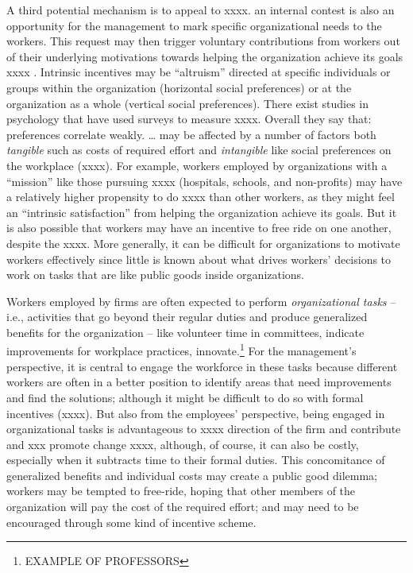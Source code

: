 \documentclass[12pt, titlepage]{article}
\begin{document}
A third potential mechanism is to appeal to xxxx. an internal contest is
also an opportunity for the management to mark specific organizational
needs to the workers. This request may then trigger voluntary
contributions from workers out of their underlying motivations towards
helping the organization achieve its goals xxxx
\citep{besley2005competition, rotemberg2006altruism}. Intrinsic
incentives may be ``altruism'' directed at specific individuals or
groups within the organization (horizontal social preferences) or at the
organization as a whole (vertical social preferences). There exist
studies in psychology that have used surveys to measure xxxx. Overall
they say that: preferences correlate weakly. \ldots{} may be affected by
a number of factors both \emph{tangible} such as costs of required
effort and \emph{intangible} like social preferences on the workplace
(xxxx). For example, workers employed by organizations with a
``mission'' like those pursuing xxxx (hospitals, schools, and
non-profits) may have a relatively higher propensity to do xxxx than
other workers, as they might feel an ``intrinsic satisfaction'' from
helping the organization achieve its goals. But it is also possible that
workers may have an incentive to free ride on one another, despite the
xxxx. More generally, it can be difficult for organizations to motivate
workers effectively since little is known about what drives workers'
decisions to work on tasks that are like public goods inside
organizations.

Workers employed by firms are often expected to perform
\emph{organizational tasks} -- i.e., activities that go beyond their
regular duties and produce generalized benefits for the organization --
like volunteer time in committees, indicate improvements for workplace
practices, innovate.\footnote{EXAMPLE OF PROFESSORS} For the
management's perspective, it is central to engage the workforce in these
tasks because different workers are often in a better position to
identify areas that need improvements and find the solutions; although
it might be difficult to do so with formal incentives (xxxx). But also
from the employees' perspective, being engaged in organizational tasks
is advantageous to xxxx direction of the firm and contribute and xxx
promote change xxxx, although, of course, it can also be costly,
especially when it subtracts time to their formal duties. This
concomitance of generalized benefits and individual costs may create a
public good dilemma; workers may be tempted to free-ride, hoping that
other members of the organization will pay the cost of the required
effort; and may need to be encouraged through some kind of incentive
scheme.
\end{document}
